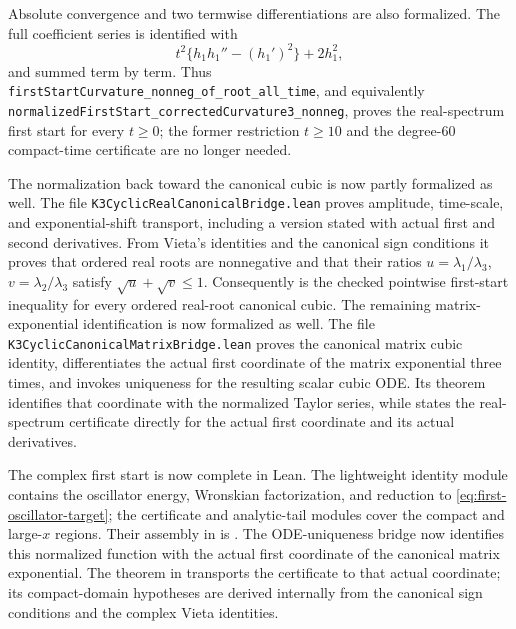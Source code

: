 \documentclass[11pt]{article}
\theoremstyle{remark}
\begin{document}
Absolute convergence and two termwise differentiations are also formalized.
The full coefficient series is identified with
\[
 t^2\{h_1h_1''-(h_1')^2\}+2h_1^2,
\]
and summed term by term.  Thus
\texttt{firstStartCurvature\_nonneg\_of\_root\_all\_time}, and equivalently
\texttt{normalizedFirstStart\_correctedCurvature3\_nonneg}, proves the
real-spectrum first start for every $t\geq0$; the former restriction
$t\geq10$ and the degree-$60$ compact-time certificate are no longer needed.

The normalization back toward the canonical cubic is now partly formalized as
well.  The file
\texttt{K3CyclicRealCanonicalBridge.lean} proves amplitude, time-scale, and
exponential-shift transport, including a version stated with actual first and
second derivatives.  From Vieta's identities and the canonical sign
conditions it proves that ordered real roots are nonnegative and that their
ratios $u=\lambda_1/\lambda_3$, $v=\lambda_2/\lambda_3$ satisfy
$\sqrt u+\sqrt v\leq1$.  Consequently
 is the checked
pointwise first-start inequality for every ordered real-root canonical cubic.
The remaining matrix-exponential identification is now formalized as well.
The file \texttt{K3CyclicCanonicalMatrixBridge.lean} proves the canonical
matrix cubic identity, differentiates the actual first coordinate of the
matrix exponential three times, and invokes uniqueness for the resulting
scalar cubic ODE.  Its theorem
 identifies that coordinate
with the normalized Taylor series, while
 states the
real-spectrum certificate directly for the actual first coordinate and its
actual derivatives.

\begin{sloppypar}
The complex first start is now complete in Lean.  The lightweight identity
module  contains the oscillator energy,
Wronskian factorization, and reduction to
\eqref{eq:first-oscillator-target}; the certificate and analytic-tail modules
cover the compact and large-$x$ regions.  Their assembly in
 is
.  The ODE-uniqueness bridge
 now identifies this normalized
function with the actual first coordinate of the canonical matrix exponential.
The theorem
 in
 transports the certificate
to that actual coordinate; its compact-domain hypotheses are derived internally
from the canonical sign conditions and the complex Vieta identities.
\end{sloppypar}
\end{document}
